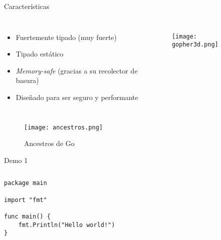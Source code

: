 \setwatermark{}

\begin{frame}{Características}

    \begin{columns}
            \begin{itemize}
                \item Fuertemente tipado (muy fuerte)
                \item Tipado estático
                \item \emph{Memory-safe} (gracias a su recolector de basura) 
                \item Diseñado para ser seguro y performante
            \end{itemize}

            \begin{figure}[H]
                \centering
                \texttt{[image: gopher3d.png]}
            \end{figure}
    \end{columns}


\end{frame}




\begin{frame}
    \begin{figure}[H]
        \centering
        \texttt{[image: ancestros.png]}
        \caption{Ancestros de Go \autocite{BookTheGoProgrammingLanguage:Preface}}
    \end{figure}
\end{frame}


\begin{frame}[fragile]{Demo 1}

{
    \renewcommand{\baselinestretch}{1} 

    \begin{columns}
        \begin{lstlisting}[title={\dq{Hola mundo!} en Go}]
package main

import "fmt"

func main() {
    fmt.Println("Hello world!")
}
        \end{lstlisting}
    \end{columns}
}
\end{frame}




